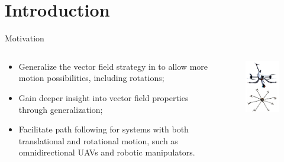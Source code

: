 
\section{Introduction}
\begin{frame}{Motivation}
    \begin{columns}[c]
    
        \begin{column}{0.6\linewidth}
            \begin{itemize}
                \item Generalize the vector field strategy in \citet{Rezende2022} to allow more motion possibilities, including rotations;
                \item Gain deeper insight into vector field properties through generalization;
                \item Facilitate path following for systems with both translational and rotational motion, such as omnidirectional UAVs and robotic manipulators.
            \end{itemize}
        \end{column}

        \begin{column}{0.4\linewidth}
 
            \begin{figure}
                \centering
                \includegraphics[width=.8\linewidth]{../figures/voliro_omni_vertical.png}
            \end{figure}


\end{column}
\end{columns}
\end{frame}

